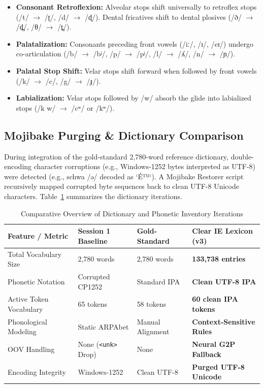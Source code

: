 \documentclass[11pt,a4paper]{article}
\begin{document}
\begin{itemize}
    \item \textbf{Consonant Retroflexion:} Alveolar stops shift universally to retroflex stops (/t/ $\rightarrow$ /ʈ/, /d/ $\rightarrow$ /ɖ/). Dental fricatives shift to dental plosives (/ð/ $\rightarrow$ /d̪/, /θ/ $\rightarrow$ /t̪/).
    \item \textbf{Palatalization:} Consonants preceding front vowels (/iː/, /ɪ/, /eɪ/) undergo co-articulation (/b/ $\rightarrow$ /bʲ/, /p/ $\rightarrow$ /pʲ/, /l/ $\rightarrow$ /ʎ/, /n/ $\rightarrow$ /ɲ/).
    \item \textbf{Palatal Stop Shift:} Velar stops shift forward when followed by front vowels (/k/ $\rightarrow$ /c/, /g/ $\rightarrow$ /ɟ/).
    \item \textbf{Labialization:} Velar stops followed by /w/ absorb the glide into labialized stops (/k w/ $\rightarrow$ /cʷ/ or /kʷ/).
\end{itemize}

\subsection{Mojibake Purging \& Dictionary Comparison}
During integration of the gold-standard 2,780-word reference dictionary, double-encoding character corruptions (e.g., Windows-1252 bytes interpreted as UTF-8) were detected (e.g., schwa /ə/ decoded as `É™`). A Mojibake Restorer script recursively mapped corrupted byte sequences back to clean UTF-8 Unicode characters. Table~\ref{tab:dictionary_comparison} summarizes the dictionary iterations.

\begin{table}[h]
    \centering
    \caption{Comparative Overview of Dictionary and Phonetic Inventory Iterations}\label{tab:dictionary_comparison}
    \vspace{0.5em}
    \begin{tabular}{p{3.5cm} p{3.2cm} p{3.2cm} p{3.8cm}}
        \toprule
        \textbf{Feature / Metric} & \textbf{Session 1 Baseline} & \textbf{Gold-Standard} & \textbf{Clear IE Lexicon (v3)} \\
        \midrule
        Total Vocabulary Size & 2,780 words & 2,780 words & \textbf{133,738 entries} \\
        Phonetic Notation & Corrupted CP1252 & Standard IPA & \textbf{Clean UTF-8 IPA} \\
        Active Token Vocabulary & 65 tokens & 58 tokens & \textbf{60 clean IPA tokens} \\
        Phonological Modeling & Static ARPAbet & Manual Alignment & \textbf{Context-Sensitive Rules} \\
        OOV Handling & None (\texttt{<unk>} Drop) & None & \textbf{Neural G2P Fallback} \\
        Encoding Integrity & Windows-1252 & Clean UTF-8 & \textbf{Purged UTF-8 Unicode} \\
        \bottomrule
    \end{tabular}
\end{table}
\end{document}

